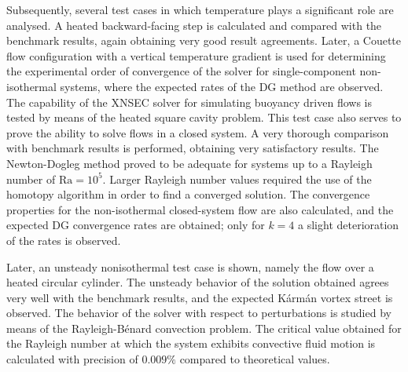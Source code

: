 Subsequently, several test cases in which temperature plays a significant role are analysed. A heated backward-facing step is calculated and compared with the benchmark results, again obtaining very good result agreements. Later, a Couette flow configuration with a vertical temperature gradient is used for determining the experimental order of convergence of the solver for single-component non-isothermal systems, where the expected rates of the DG method are observed. The capability of the XNSEC solver for simulating buoyancy driven flows is tested by means of the heated square cavity problem. This test case also serves to prove the ability to solve flows in a closed system. A very thorough comparison with benchmark results is performed, obtaining very satisfactory results. The Newton-Dogleg method proved to be adequate for systems up to a Rayleigh number of $\text{Ra} = 10^5$. Larger Rayleigh number values required the use of the homotopy algorithm in order to find a converged solution. The convergence properties for the non-isothermal closed-system flow are also calculated, and the expected DG convergence rates are obtained; only for $k=4$ a slight deterioration of the rates is observed.

Later, an unsteady nonisothermal test case is shown, namely the flow over a heated circular cylinder. The unsteady behavior of the solution obtained agrees very well with the benchmark results, and the expected Kármán vortex street is observed. The behavior of the solver with respect to perturbations is studied by means of the Rayleigh-Bénard convection problem. The critical value obtained for the Rayleigh number at which the system exhibits convective fluid motion is calculated with precision of $0.009\%$ compared to theoretical values. 

